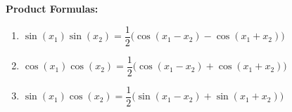 \documentclass[12pt]{article}
\begin{document}
\vspace{1cm} 

\textbf{Product Formulas:}

\begin{enumerate}
\item $\sin(x_{1})\sin(x_{2}) = \dfrac{1}{2}\Big(\cos(x_{1} - x_{2}) - \cos(x_{1}+x_{2})\Big)$
\item $\cos(x_{1}) \cos(x_{2}) = \dfrac{1}{2}\Big(\cos(x_{1} - x_{2}) + \cos(x_{1}+x_{2})\Big)$
\item $\sin(x_{1}) \cos(x_{2}) = \dfrac{1}{2}\Big(\sin(x_{1} - x_{2}) + \sin(x_{1}+x_{2})\Big)$
\end{enumerate}
\end{document}
